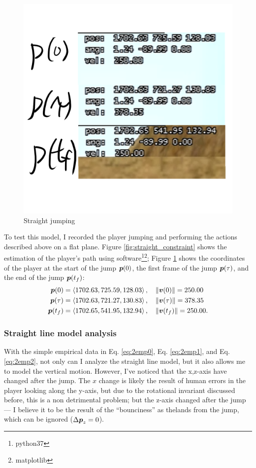 \begin{figure}[H]
\begin{minipage}{.5\textwidth}
        \includegraphics[width=0.9\linewidth]{assets/2straightjumping.png}
        \caption{Straight jumping}
        \label{fig:2straightjumping}
    \end{minipage}
\end{figure}

To test this model, I recorded the player jumping and performing the actions described above on a flat plane. Figure \ref{fig:straight_constraint} shows the estimation of the player's path using software\footnote{python37}\footnote{matplotlib}; Figure \ref{fig:2straightjumping} shows the coordinates of the player at the start of the jump $\boldsymbol{p}(0)$, the first frame of the jump $\boldsymbol{p}(\tau)$, and the end of the jump $\boldsymbol{p}(t_f)$:
\begin{align}
 \boldsymbol{p}(0) &= \left\langle 1702.63, 725.59, 128.03 \right\rangle, \quad \|\boldsymbol{v}(0)\| = 250.00 \label{eq:2emp0}\\
 \boldsymbol{p}(\tau) &= \left\langle 1702.63, 721.27, 130.83 \right\rangle, \quad \|\boldsymbol{v}(\tau)\| = 378.35 \label{eq:2emp1}\\
 \boldsymbol{p}(t_f) &= \left\langle 1702.65,541.95, 132.94 \right\rangle, \quad \|\boldsymbol{v}(t_f)\| = 250.00 \label{eq:2emp2}.
\end{align}

\subsubsection{Straight line model analysis}
With the simple empirical data in Eq. \ref{eq:2emp0}, Eq. \ref{eq:2emp1}, and Eq. \ref{eq:2emp2}, not only can I analyze the straight line model, but it also allows me to model the vertical motion. However, I've noticed that the x,z-axis have changed after the jump. The $x$ change is likely the result of human errors in the player looking along the y-axis, but due to the rotational invariant discussed before, this is a non detrimental problem; but the z-axis changed after the jump --- I believe it to be the result of the ``bounciness'' as thelands from the jump, which can be ignored ($\Delta \boldsymbol{p}_z = 0$).


